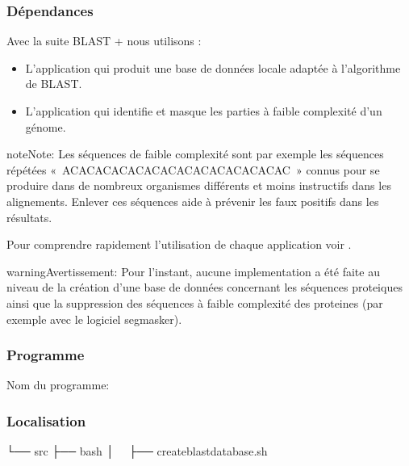 \documentclass[letterpaper,10pt,french]{sphinxmanual}
\begin{document}
\subsubsection{Dépendances}
\label{\detokenize{tutorial:id31}}
Avec la suite BLAST + nous utilisons :
\begin{itemize}
\item {} 
L’application  qui produit une base de données locale adaptée à l’algorithme de BLAST.

\item {} 
L’application  qui identifie et masque les parties à faible complexité d’un génome.

\end{itemize}

\begin{sphinxadmonition}{note}{Note:}
Les séquences de faible complexité sont par exemple les séquences répétées « ACACACACACACACACACACACACACAC » connus pour se produire dans de nombreux organismes différents et moins instructifs dans les alignements. Enlever ces séquences aide à prévenir les faux positifs dans les résultats.
\end{sphinxadmonition}




Pour comprendre rapidement l’utilisation de chaque application voir  .



\begin{sphinxadmonition}{warning}{Avertissement:}
Pour l’instant, aucune implementation a été faite au niveau de la création d’une base de données concernant les séquences proteiques ainsi que la suppression des séquences à faible complexité des proteines (par exemple avec le logiciel segmasker).
\end{sphinxadmonition}


\subsubsection{Programme}
\label{\detokenize{tutorial:id32}}
Nom du programme:

\begin{sphinxVerbatim}[commandchars=\\\{\}]
\end{sphinxVerbatim}


\subsubsection{Localisation}
\label{\detokenize{tutorial:id33}}
\begin{sphinxVerbatim}[commandchars=\\\{\}]
└── src
 ├── bash
 │   ├── create\PYGZus{}blast\PYGZus{}database.sh
\end{sphinxVerbatim}
\end{document}
